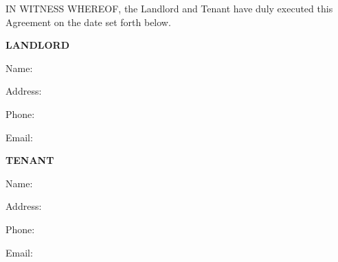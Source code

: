 
IN WITNESS WHEREOF, the Landlord and Tenant have duly executed this Agreement on the date set forth below.


\vspace{0.5in}

\hspace{3in}
\textbf{LANDLORD}

\vspace{0.2in}
\hspace{3in}
Name: \LandlordName{}

\vspace{0.2in}

\hspace{3in}
\parbox{3.5in}{
Address: \LandlordAddress{}
}
\vspace{0.2in}

\hspace{3in}
Phone: \LandlordPhone{}

\vspace{0.2in}

\hspace{3in}
Email: \LandlordEmail{}


\vspace{0.5in}

\hspace{3in}
\textbf{TENANT}

\vspace{0.2in}
\hspace{3in}
Name: \TenantName{}

\vspace{0.2in}

\hspace{3in}
\parbox{3.5in}{
Address: \TenantAddress{}
}
\vspace{0.2in}

\hspace{3in}
Phone: \TenantPhone{}

\vspace{0.2in}

\hspace{3in}
Email: \TenantEmail{}

